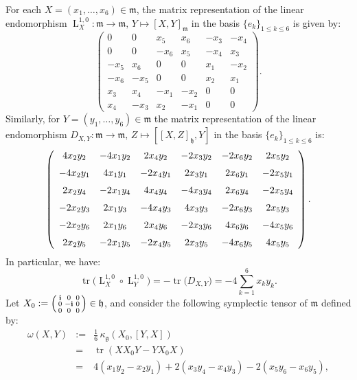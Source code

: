\documentclass[preprint,12pt,1p]{elsarticle}
\theoremstyle{plain}
\theoremstyle{definition}
\newcommand{\ro}{\circ}
\newcommand{\w}{\omega}
\newcommand{\tr}{\operatorname{tr}}
\newcommand{\h}{\mathfrak{h}}
\newcommand{\lm}{\operatorname{L}^{1,0}}
\numberwithin{equation}{section}
\newcommand{\Aa}{x_1}
\newcommand{\Ba}{x_2}
\newcommand{\Ab}{x_3}
\newcommand{\Bb}{x_4}
\newcommand{\Ac}{x_5}
\newcommand{\Bc}{x_6}
\newcommand{\Ca}{y_1}
\newcommand{\Da}{y_2}
\newcommand{\Cb}{y_3}
\newcommand{\Db}{y_4}
\newcommand{\Cc}{y_5}
\newcommand{\Dc}{y_6}
\begin{document}
For each $X=(x_1,\ldots,x_6)\in\mathfrak{m}$, the matrix representation of the linear endomorphism $\lm_X:\mathfrak{m}\to\mathfrak{m},\,Y\mapsto[X,Y]_\mathfrak{m}$ in the basis $\{e_k\}_{1\leqslant k\leqslant 6}$ is given by:
\begin{equation}\label{admXSU3}
\begin{pmatrix}
0&0&\Ac&\Bc&-\Ab&-\Bb\\
0&0&-\Bc&\Ac&-\Bb&\Ab\\
-\Ac&\Bc&0&0&\Aa&-\Ba\\
-\Bc&-\Ac&0&0&\Ba&\Aa\\
\Ab&\Bb&-\Aa&-\Ba&0&0\\
\Bb&-\Ab&\Ba&-\Aa&0&0
\end{pmatrix}.
\end{equation}
Similarly, for $Y=(\Ca,\ldots,\Dc)\in\mathfrak{m}$ the matrix representation of the linear endomorphism $D_{X,Y}:\mathfrak{m}\to\mathfrak{m},\,Z\mapsto\left[[X,Z]_\h,Y\right]$ in the basis $\{e_k\}_{1\leqslant k\leqslant 6}$ is:
\begin{equation*}
\left(\begin{array}{cccccc} 4\Ba\Da&-4\Aa\Da&2\Bb\Da&-2\Ab\Da&-2\Bc\Da&2\Ac\Da\\ 
\noalign{\medskip}-4\Ba\Ca&4\Aa\Ca&-2\Bb\Ca&2\Ab\Ca&2\Bc\Ca&-2\Ac\Ca\\
\noalign{\medskip}2\Ba\Db&-2\Aa\Db&4\Bb\Db&-4\Ab\Db&2\Bc\Db&-2\Ac\Db\\
\noalign{\medskip}-2\Ba\Cb&2\Aa\Cb&-4\Bb\Cb&4\Ab\Cb&-2
\Bc\Cb&2\Ac\Cb\\ 
\noalign{\medskip}-2\Ba\Dc&2\Aa\Dc&2\Bb\Dc&-2\Ab\Dc&4
\Bc\Dc&-4\Ac\Dc\\
\noalign{\medskip}2\Ba\Cc&-2\Aa\Cc&-2\Bb\Cc&2\Ab\Cc&-4\Bc\Cc&4\Ac\Cc\end{array}\right).
\end{equation*}
In particular, we have:
\begin{equation}\label{RicSPartI}
\tr\big(\lm_X\ro\lm_Y\big)=-\tr\big(D_{X,Y}\big)=-4\sum_{k=1}^6x_ky_k.
\end{equation}
Let $X_0:=\begin{psmallmatrix}
\mathbf{i}&0&0\\
0&-\mathbf{i}&0\\
0&0&0
\end{psmallmatrix}\in\h$, and consider the following symplectic tensor of $\mathfrak{m}$ defined by:
\begin{eqnarray*}
\w(X,Y)&:=&\tfrac{1}{6}\,\kappa_\mathfrak{g}\left(X_0,[Y,X]\right)\\
&=&\tr(XX_0Y-YX_0X)\\
&=&4(x_1y_2-x_2y_1)+2(x_3y_4-x_4y_3)-2(x_5y_6-x_6y_5),
\end{eqnarray*}
\end{document}
